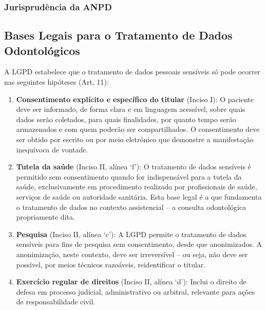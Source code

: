 \subsubsection{Jurisprudência da ANPD}


\subsection{Bases Legais para o Tratamento de Dados Odontológicos}

A LGPD estabelece que o tratamento de dados pessoais sensíveis só pode ocorrer
nas seguintes hipóteses (Art. 11):

\begin{enumerate}
  \item \textbf{Consentimento explícito e específico do titular} (Inciso I):
    O paciente deve ser informado, de forma clara e em linguagem acessível,
    sobre quais dados serão coletados, para quais finalidades, por quanto tempo
    serão armazenados e com quem poderão ser compartilhados. O consentimento
    deve ser obtido por escrito ou por meio eletrônico que demonstre a
    manifestação inequívoca de vontade.

  \item \textbf{Tutela da saúde} (Inciso II, alínea `f'): O tratamento de dados
    sensíveis é permitido sem consentimento quando for indispensável para a
    tutela da saúde, exclusivamente em procedimento realizado por profissionais
    de saúde, serviços de saúde ou autoridade sanitária. Esta base legal é a
    que fundamenta o tratamento de dados no contexto assistencial -- a consulta
    odontológica propriamente dita.

  \item \textbf{Pesquisa} (Inciso II, alínea `c'): A LGPD permite o tratamento
    de dados sensíveis para fins de pesquisa sem consentimento, desde que
    anonimizados. A anonimização, neste contexto, deve ser irreversível -- ou
    seja, não deve ser possível, por meios técnicos razoáveis, reidentificar o
    titular.

  \item \textbf{Exercício regular de direitos} (Inciso II, alínea `d'): Inclui
    o direito de defesa em processo judicial, administrativo ou arbitral,
    relevante para ações de responsabilidade civil.
\end{enumerate}

